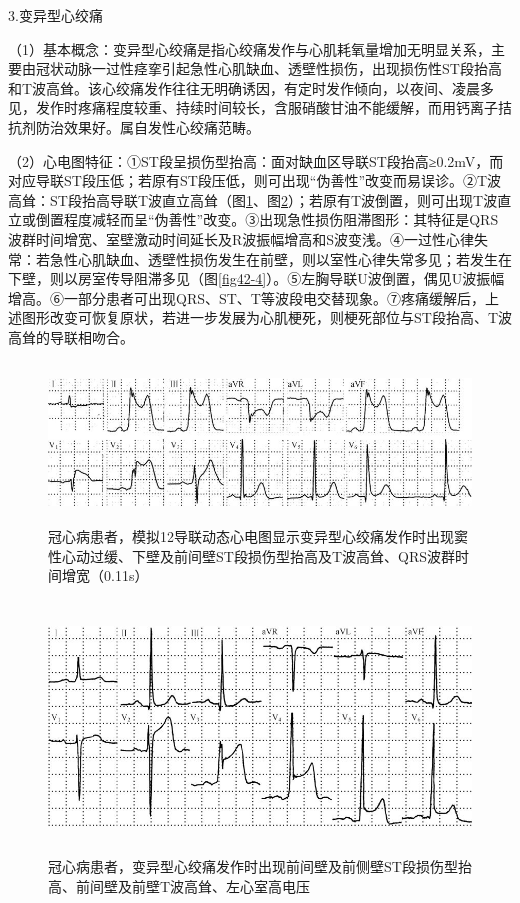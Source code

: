 3.变异型心绞痛

（1）基本概念：变异型心绞痛是指心绞痛发作与心肌耗氧量增加无明显关系，主要由冠状动脉一过性痉挛引起急性心肌缺血、透壁性损伤，出现损伤性ST段抬高和T波高耸。该心绞痛发作往往无明确诱因，有定时发作倾向，以夜间、凌晨多见，发作时疼痛程度较重、持续时间较长，含服硝酸甘油不能缓解，而用钙离子拮抗剂防治效果好。属自发性心绞痛范畴。

（2）心电图特征：①ST段呈损伤型抬高：面对缺血区导联ST段抬高≥0.2mV，而对应导联ST段压低；若原有ST段压低，则可出现“伪善性”改变而易误诊。②T波高耸：ST段抬高导联T波直立高耸（图\ref{fig42-2}、图\ref{fig42-3}）；若原有T波倒置，则可出现T波直立或倒置程度减轻而呈“伪善性”改变。③出现急性损伤阻滞图形：其特征是QRS波群时间增宽、室壁激动时间延长及R波振幅增高和S波变浅。④一过性心律失常：若急性心肌缺血、透壁性损伤发生在前壁，则以室性心律失常多见；若发生在下壁，则以房室传导阻滞多见（图\ref{fig42-4}）。⑤左胸导联U波倒置，偶见U波振幅增高。⑥一部分患者可出现QRS、ST、T等波段电交替现象。⑦疼痛缓解后，上述图形改变可恢复原状，若进一步发展为心肌梗死，则梗死部位与ST段抬高、T波高耸的导联相吻合。

\begin{figure}[!htbp]
 \centering
 \includegraphics[width=5.5625in,height=1.67708in]{./images/Image00693.jpg}
 \captionsetup{justification=centering}
 \caption{冠心病患者，模拟12导联动态心电图显示变异型心绞痛发作时出现窦性心动过缓、下壁及前间壁ST段损伤型抬高及T波高耸、QRS波群时间增宽（0.11s）}
 \label{fig42-2}
  \end{figure} 

\begin{figure}[!htbp]
 \centering
 \includegraphics[width=5.5625in,height=2.63542in]{./images/Image00694.jpg}
 \captionsetup{justification=centering}
 \caption{冠心病患者，变异型心绞痛发作时出现前间壁及前侧壁ST段损伤型抬高、前间壁及前壁T波高耸、左心室高电压}
 \label{fig42-3}
  \end{figure} 

